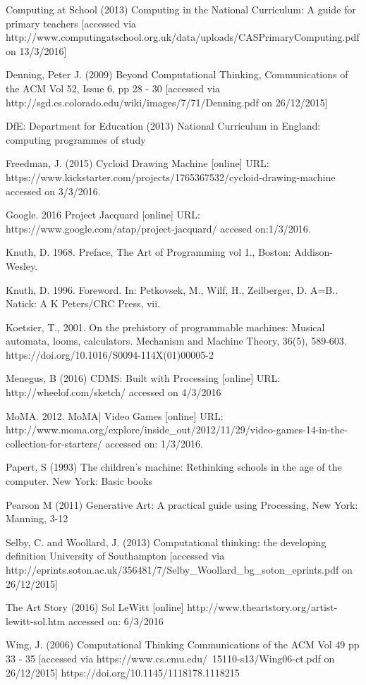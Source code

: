 \documentclass[krantz1,ChapterTOCs, book]{krantz}
\begin{document}
Computing at School (2013) Computing in the National Curriculum: A guide for primary teachers [accessed via http://www.computingatschool.org.uk/data/uploads/CASPrimaryComputing.pdf on 13/3/2016]
 
Denning, Peter J. (2009) Beyond Computational Thinking, Communications of the ACM Vol 52, Issue 6, pp 28 - 30 [accessed via http://sgd.cs.colorado.edu/wiki/images/7/71/Denning.pdf on 26/12/2015]
 
DfE: Department for Education (2013) National Curriculum in England: computing programmes of study
 
Freedman, J. (2015) Cycloid Drawing Machine [online] URL: https://www.kickstarter.com/projects/1765367532/cycloid-drawing-machine accessed on 3/3/2016.
 
Google. 2016 Project Jacquard [online] URL: https://www.google.com/atap/project-jacquard/ accesed on:1/3/2016.
 
Knuth, D. 1968. Preface, The Art of Programming vol 1., Boston: Addison-Wesley.
 
Knuth, D. 1996. Foreword. In: Petkovsek, M., Wilf, H., Zeilberger, D. A=B.. Natick: A K Peters/CRC Press, vii.
 
Koetsier, T., 2001. On the prehistory of programmable machines: Musical automata, looms, calculators. Mechanism and Machine Theory, 36(5), 589-603.
https://doi.org/10.1016/S0094-114X(01)00005-2
 
Menegus, B (2016) CDMS: Built with Processing [online] URL: http://wheelof.com/sketch/ accessed on 4/3/2016
 
MoMA. 2012. MoMA| Video Games [online] URL: http://www.moma.org/explore/inside_out/2012/11/29/video-games-14-in-the-collection-for-starters/ accessed on: 1/3/2016.
 
Papert, S (1993) The children's machine: Rethinking schools in the age of the computer. New York: Basic books
 
Pearson M (2011) Generative Art: A practical guide using Processing, New York: Manning, 3-12
 
Selby, C. and Woollard, J. (2013) Computational thinking: the developing definition University of Southampton [accessed via http://eprints.soton.ac.uk/356481/7/Selby_Woollard_bg_soton_eprints.pdf on 26/12/2015]
 
The Art Story (2016) Sol LeWitt [online] http://www.theartstory.org/artist-lewitt-sol.htm accessed on: 6/3/2016
 
Wing, J. (2006) Computational Thinking Communications of the ACM Vol 49 pp 33 - 35 [accessed via https://www.cs.cmu.edu/~15110-s13/Wing06-ct.pdf on 26/12/2015]
https://doi.org/10.1145/1118178.1118215
 
\end{document}
